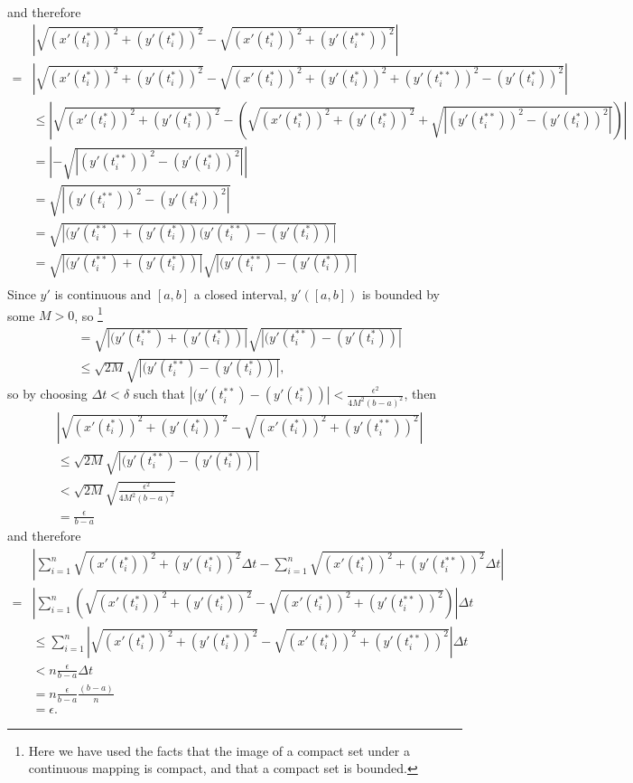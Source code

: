 \documentclass[12pt,letterpaper,reqno]{article}
\numberwithin{equation}{section}
\begin{document}
{\begin{pf}
\begin{align*}
\end{align*}
and therefore
\begin{align*}
	&\left|\sqrt{(x'(t_i^*))^2+(y'(t_i^{*}))^2}-\sqrt{(x'(t_i^*))^2+(y'(t_i^{**}))^2}\right|\\
	=& \left|\sqrt{(x'(t_i^*))^2+(y'(t_i^{*}))^2}-\sqrt{(x'(t_i^*))^2+(y'(t_i^{*}))^2+(y'(t_i^{**}))^2-(y'(t_i^{*}))^2}\right| \\
	& \leq \left|\sqrt{(x'(t_i^*))^2+(y'(t_i^{*}))^2}-\left(\sqrt{(x'(t_i^*))^2+(y'(t_i^{*}))^2}+\sqrt{|(y'(t_i^{**}))^2-(y'(t_i^{*}))^2|}\right)\right| \\
	&=\left|-\sqrt{|(y'(t_i^{**}))^2-(y'(t_i^{*}))^2|}\right| \\
	&=\sqrt{|(y'(t_i^{**}))^2-(y'(t_i^{*}))^2|} \\
	&=\sqrt{|(y'(t_i^{**})+(y'(t_i^{*}))(y'(t_i^{**})-(y'(t_i^{*}))|} \\
	&=\sqrt{|(y'(t_i^{**})+(y'(t_i^{*}))|}\sqrt{|(y'(t_i^{**})-(y'(t_i^{*}))|} \\
\end{align*}
Since $y'$ is continuous and $[a,b]$ a closed interval, $y'([a,b])$ is bounded by some $M>0$, so \footnote{Here we have used the facts that the image of a compact set under a continuous mapping is compact, and that a compact set is bounded.}
\begin{align*}
	&=\sqrt{|(y'(t_i^{**})+(y'(t_i^{*}))|}\sqrt{|(y'(t_i^{**})-(y'(t_i^{*}))|} \\
	&\leq \sqrt{2M}\sqrt{|(y'(t_i^{**})-(y'(t_i^{*}))|},
\end{align*}
so by choosing $\Delta t<\delta$ such that $|(y'(t_i^{**})-(y'(t_i^{*}))|<\frac{\epsilon^2}{4M^2(b-a)^2}$, then 
\begin{align*}
	&\left|\sqrt{(x'(t_i^*))^2+(y'(t_i^{*}))^2}-\sqrt{(x'(t_i^*))^2+(y'(t_i^{**}))^2}\right|\\
	&\leq \sqrt{2M}\sqrt{|(y'(t_i^{**})-(y'(t_i^{*}))|} \\
	&< \sqrt{2M}\sqrt{\frac{\epsilon^2}{4M^2(b-a)^2}} \\
	&=\frac{\epsilon}{b-a}
\end{align*}
and therefore
\begin{align*}
	&\left|\sum_{i=1}^n\sqrt{(x'(t_i^*))^2+(y'(t_i^{*}))^2}\Delta t-\sum_{i=1}^n\sqrt{(x'(t_i^*))^2+(y'(t_i^{**}))^2}\Delta t\right| \\
	=&\left|\sum_{i=1}^n\left(\sqrt{(x'(t_i^*))^2+(y'(t_i^{*}))^2}-\sqrt{(x'(t_i^*))^2+(y'(t_i^{**}))^2}\right)\right|\Delta t \\
	&\leq \sum_{i=1}^n\left|\sqrt{(x'(t_i^*))^2+(y'(t_i^{*}))^2}-\sqrt{(x'(t_i^*))^2+(y'(t_i^{**}))^2}\right|\Delta t \\
	&<n\frac{\epsilon}{b-a} \Delta t \\
	&=n\frac{\epsilon}{b-a}\frac{(b-a)}{n} \\
	&=\epsilon.
\end{align*}
\end{pf}
\newpage 

}
\end{document}
